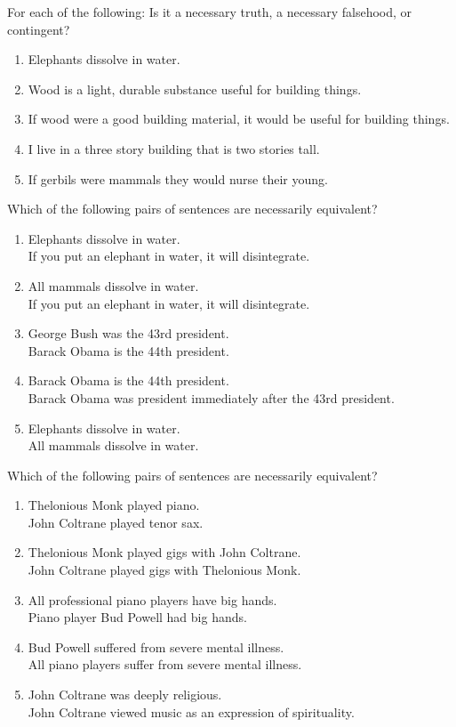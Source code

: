 \problempart
For each of the following: Is it a necessary truth, a necessary falsehood, or contingent?
\begin{enumerate}
\item Elephants dissolve in water.
\item Wood is a light, durable substance useful for building things.
\item If wood were a good building material, it would be useful for building things.
\item I live in a three story building that is two stories tall.
\item If gerbils were mammals they would nurse their young.
\end{enumerate}

\problempart Which of the following pairs of sentences are necessarily  equivalent? 

\begin{enumerate}
\item Elephants dissolve in water.	\\
	If you put an elephant in water, it will disintegrate.
\item All mammals dissolve in water.\\		
	If you put an elephant in water, it will disintegrate.
\item George Bush was the 43rd president. \\
	 Barack Obama is the 44th president.
\item Barack Obama is the 44th president. \\
	  Barack Obama was president immediately after the 43rd president.
\item Elephants dissolve in water. 	\\	
	All mammals dissolve in water.
\end{enumerate}
\problempart Which of the following pairs of sentences are necessarily equivalent? 

\begin{enumerate}
\item  Thelonious Monk played piano.	\\
	John Coltrane played tenor sax.
\item  Thelonious Monk played gigs with John Coltrane.	\\
	John Coltrane played gigs with Thelonious Monk.
\item  All professional piano players have big hands.	\\
	Piano player Bud Powell had big hands.
\item  Bud Powell suffered from severe mental illness.	 \\
	All piano players suffer from severe mental illness.
\item John Coltrane was deeply religious.	 \\
John Coltrane viewed music as an expression of spirituality.
\end{enumerate}

